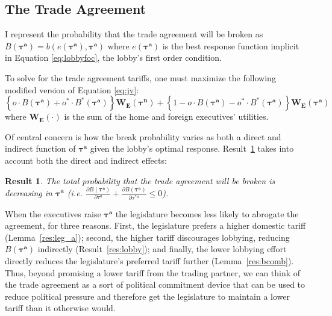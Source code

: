 \documentclass[10pt]{article}
\newtheorem{result}{Result}
\newcommand{\bta}{\bm{\tau^a}}
\newcommand{\btn}{\bm{\tau^n}}
\begin{document}
\subsection{The Trade Agreement}
\label{sec:ta}
I represent the probability that the trade agreement will be broken as $B(\bta)=b(e(\bta),\bta)$ where $e(\bta)$ is the best response function implicit in Equation \ref{eq:lobbyfoc}, the lobby's first order condition.

To solve for the trade agreement tariffs, one must maximize the following modified version of Equation \ref{eq:jv}:
\begin{equation}
    \left\{ o \cdot B(\bta) + o^* \cdot B^*(\bta) \right\} \bm{W_E}(\btn) + \left\{ 1- o \cdot B(\bta) - o^* \cdot B^*(\bta) \right\} \bm{W_E}(\bta)  
  \label{eq:jv2}
\end{equation}
where $\bm{W_E}(\cdot)$ is the sum of the home and foreign executives' utilities.

Of central concern is how the break probability varies as both a direct and indirect function of $\bta$ given the lobby's optimal response. Result~\ref{res:bcomB} takes into account both the direct and indirect effects:

\begin{result}
	The total probability that the trade agreement will be broken is decreasing in $\bta$ (i.e. $\frac{\partial B(\bta)}{\partial  \tau^a} + \frac{\partial B(\bta)}{\partial  \tau^{*a}} \leq 0$).
	\label{res:bcomB}
\end{result}

\noindent When the executives raise $\bta$ the legislature becomes less likely to abrogate the agreement, for three reasons. First, the legislature prefers a higher domestic tariff (Lemma~\ref{res:leg_a}); second, the higher tariff discourages lobbying, reducing $B(\bta)$ indirectly (Result~\ref{res:lobby}); and finally, the lower lobbying effort directly reduces the legislature's preferred tariff further (Lemma~\ref{res:bcomb}). Thus, beyond promising a lower tariff from the trading partner, we can think of the trade agreement as a sort of political commitment device that can be used to reduce political pressure and therefore get the legislature to maintain a lower tariff than it otherwise would.
\end{document}
